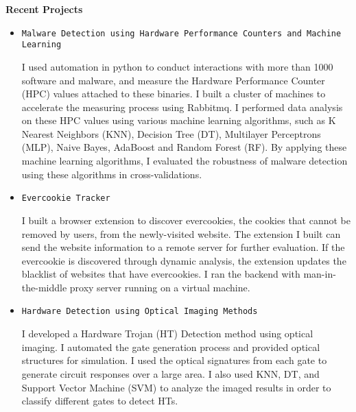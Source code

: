\documentclass[]{article}
\begin{document}
\noindent \textbf{Recent Projects}
\begin{itemize}

		\item \verb+Malware Detection using Hardware Performance Counters and Machine Learning+

I used automation in python to conduct interactions with more than 1000 software and malware, and measure 
the Hardware Performance Counter (HPC) values attached to these binaries. I built a cluster of 
machines to accelerate the measuring process using Rabbitmq. I performed data analysis on
these HPC values using various machine learning algorithms, such as K Nearest Neighbors (KNN), Decision 
Tree (DT), Multilayer Perceptrons (MLP), Naive Bayes, AdaBoost and Random Forest (RF). By applying 
these machine learning algorithms, I evaluated the robustness of malware detection using these algorithms
in cross-validations.  


		\item \verb+Evercookie Tracker+

I built a browser extension to discover evercookies, the cookies that cannot be removed
by users, from the newly-visited website. The extension I built can send the website information 
to a remote server for further evaluation. If the evercookie is discovered through dynamic analysis, 
the extension updates the blacklist of websites that have evercookies. I ran the backend with 
man-in-the-middle proxy server running on a virtual machine. 


		\item \verb+Hardware Detection using Optical Imaging Methods+

I developed a Hardware Trojan (HT) Detection method using optical imaging. I automated the gate
generation process and provided optical structures for simulation. I used the optical signatures
from each gate to generate circuit responses over a large area. I also used KNN, DT, and Support Vector Machine (SVM) 
to analyze the imaged results in order to classify different gates to detect HTs. 
		
\end{itemize}
\end{document}
